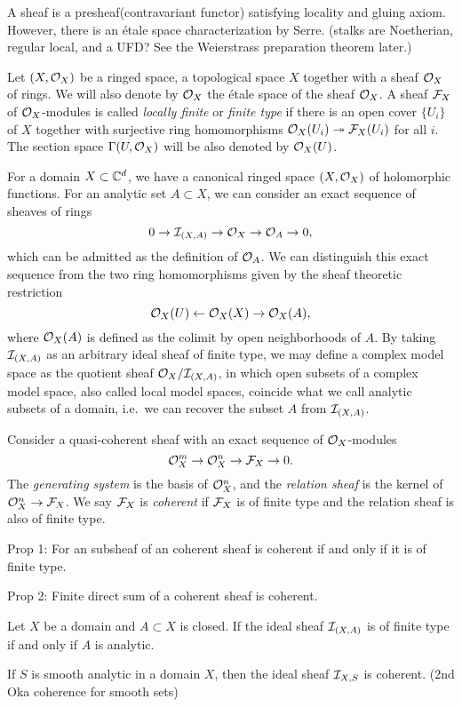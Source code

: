 \documentclass{../../large}
\begin{document}
\begin{prb}
A sheaf is a presheaf(contravariant functor) satisfying locality and gluing axiom.
However, there is an \'etale space characterization by Serre.
(stalks are Noetherian, regular local, and a UFD?
See the Weierstrass preparation theorem later.)
\end{prb}

\begin{prb}
Let $(X,\mathcal{O}_X)$ be a ringed space, a topological space $X$ together with a sheaf $\mathcal{O}_X$ of rings.
We will also denote by $\mathcal{O}_X$ the \'etale space of the sheaf $\mathcal{O}_X$.
A sheaf $\mathcal{F}_X$ of $\mathcal{O}_X$-modules is called \emph{locally finite} or \emph{finite type} if there is an open cover $\{U_i\}$ of $X$ together with surjective ring homomorphisms $\mathcal{O}_X(U_i)\twoheadrightarrow\mathcal{F}_X(U_i)$ for all $i$.
The section space $\Gamma(U,\mathcal{O}_X)$ will be also denoted by $\mathcal{O}_X(U)$.
\end{prb}

\begin{prb}
For a domain $X\subset\mathbb{C}^d$, we have a canonical ringed space $(X,\mathcal{O}_X)$ of holomorphic functions.
For an analytic set $A\subset X$, we can consider an exact sequence of sheaves of rings
\[0\to\mathcal{I}_{(X,A)}\to\mathcal{O}_X\to\mathcal{O}_A\to0,\]
which can be admitted as the definition of $\mathcal{O}_A$.
We can distinguish this exact sequence from the two ring homomorphisms given by the sheaf theoretic restriction
\[\mathcal{O}_X(U)\leftarrow\mathcal{O}_X(X)\to\mathcal{O}_X(A),\]
where $\mathcal{O}_X(A)$ is defined as the colimit by open neighborhoods of $A$.
By taking $\mathcal{I}_{(X,A)}$ as an arbitrary ideal sheaf of finite type, we may define a complex model space as the quotient sheaf $\mathcal{O}_X/\mathcal{I}_{(X,A)}$, in which open subsets of a complex model space, also called local model spaces, coincide what we call analytic subsets of a domain, i.e.~we can recover the subset $A$ from $\mathcal{I}_{(X,A)}$.
\end{prb}

\begin{prb}
Consider a quasi-coherent sheaf with an exact sequence of $\mathcal{O}_X$-modules
\[\mathcal{O}_X^m\to\mathcal{O}_X^n\to\mathcal{F}_X\to0.\]
The \emph{generating system} is the basis of $\mathcal{O}_X^n$, and the \emph{relation sheaf} is the kernel of $\mathcal{O}_X^n\to\mathcal{F}_X$.
We say $\mathcal{F}_X$ is \emph{coherent} if $\mathcal{F}_X$ is of finite type and the relation sheaf is also of finite type.
\end{prb}


Prop 1: For an subsheaf of an coherent sheaf is coherent if and only if it is of finite type.

Prop 2: Finite direct sum of a coherent sheaf is coherent.


\begin{thm*}[2.2.12]
Let $X$ be a domain and $A\subset X$ is closed.
If the ideal sheaf $\mathcal{I}_{(X,A)}$ is of finite type if and only if $A$ is analytic.
\end{thm*}
\begin{thm*}[2.2.17]
If $S$ is smooth analytic in a domain $X$, then the ideal sheaf $\mathcal{I}_{X,S}$ is coherent. (2nd Oka coherence for smooth sets)
\end{thm*}
\end{document}
